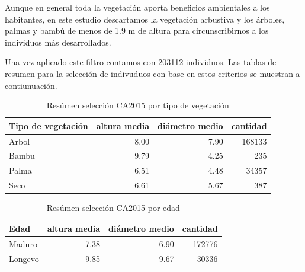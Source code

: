 \documentclass[12pt,]{book}
\begin{document}
Aunque en general toda la vegetación aporta beneficios ambientales a los
habitantes, en este estudio descartamos la vegetación arbustiva y los
árboles, palmas y bambú de menos de 1.9 m de altura para
circunscribirnos a los individuos más desarrollados.

Una vez aplicado este filtro contamos con 203112 individuos. Las tablas
de resumen para la selección de indivuduos con base en estos criterios
se muestran a contiunuación.

\begin{table}

\caption{\label{tab:ca2015sel-vegetacion}Resúmen selección CA2015 por tipo de vegetación}
\centering
\begin{tabular}[t]{l|r|r|r}
\hline
Tipo de vegetación & altura media & diámetro medio & cantidad\\
\hline
Arbol & 8.00 & 7.90 & 168133\\
\hline
Bambu & 9.79 & 4.25 & 235\\
\hline
Palma & 6.51 & 4.48 & 34357\\
\hline
Seco & 6.61 & 5.67 & 387\\
\hline
\end{tabular}
\end{table}

\begin{table}

\caption{\label{tab:ca2015sel-edad}Resúmen selección CA2015 por edad}
\centering
\begin{tabular}[t]{l|r|r|r}
\hline
Edad & altura media & diámetro medio & cantidad\\
\hline
Maduro & 7.38 & 6.90 & 172776\\
\hline
Longevo & 9.85 & 9.67 & 30336\\
\hline
\end{tabular}
\end{table}
\end{document}
